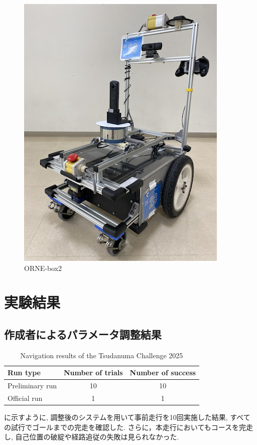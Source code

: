 \begin{figure}[hbtp]
  \centering
 \includegraphics[keepaspectratio, scale=0.3]
      {images/box2.png}
 \caption{ORNE-box2}
 \label{Fig:ORNE-box2}
\end{figure}




\newpage
\section{実験結果}
\subsection{作成者によるパラメータ調整結果}
\begin{table}[htbp]
  \centering
  \caption{Navigation results of the Tsudanuma Challenge 2025}
  \label{tab:tsudanuma_result}
  \begin{tabular}{lcc}
    \hline
    \textbf{Run type} & \textbf{Number of trials} & \textbf{Number of success} \\
    \hline
    Preliminary run & 10 & 10 \\
    Official run        & 1  & 1  \\
    \hline
  \end{tabular}
\end{table}
に示すように, 調整後のシステムを用いて事前走行を10回実施した結果, すべての試行でゴールまでの完走を確認した. 
さらに，本走行においてもコースを完走し, 自己位置の破綻や経路追従の失敗は見られなかった. 

